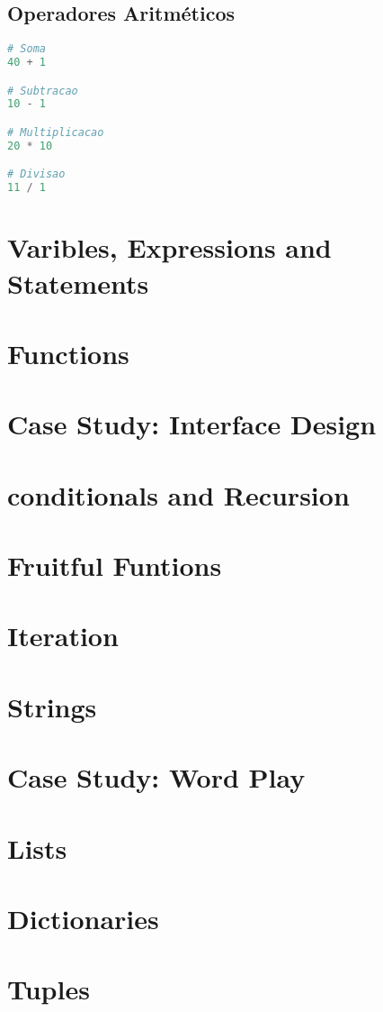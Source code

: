 \documentclass[a4paper,11pt]{book}
\begin{document}
\section{Operadores Aritméticos}
\begin{lstlisting}[language=Python, caption=Operadores Básicos]
# Soma
40 + 1

# Subtracao
10 - 1

# Multiplicacao
20 * 10

# Divisao
11 / 1

\end{lstlisting}

\chapter{Varibles, Expressions and Statements}
\chapter{Functions}
\chapter{Case Study: Interface Design}
\chapter{conditionals and Recursion}
\chapter{Fruitful Funtions}
\chapter{Iteration}
\chapter{Strings}
\chapter{Case Study: Word Play}
\chapter{Lists}
\chapter{Dictionaries}
\chapter{Tuples}
\end{document}
